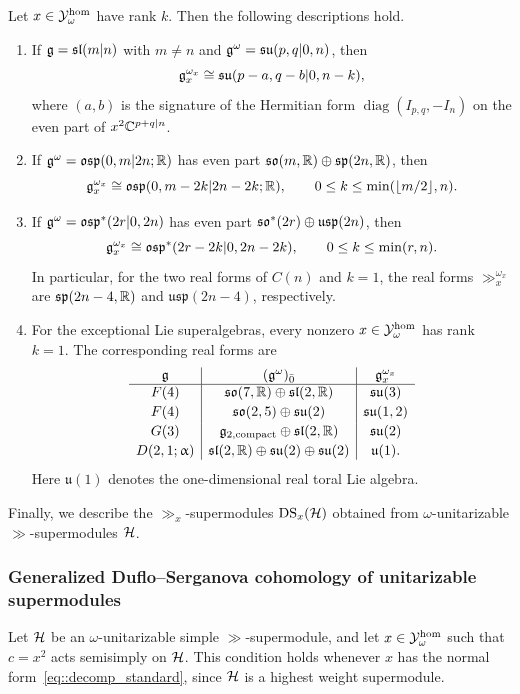 \begin{proposition}\label{prop::unitary_real_forms_and_DS}
Let $x\in\YY_\omega^{\hom}$ have rank $k$. Then the following descriptions hold. 
\begin{enumerate}
\item[(a)] If $\gg=\sl(m\vert n)$ with $m\neq n$ and $\gg^\omega=\su(p,q\vert0,n)$, then
\[
\gg_x^{\omega_x}
\cong\su(p-a,q-b\vert0,n-k),
\]
where $(a,b)$ is the signature of the Hermitian form $\operatorname{diag}(I_{p,q},-I_n)$ on the even part of $x^2\CC^{p+q\vert n}$.

\item[(b)] If $\gg^\omega=\osp(0,m\vert2n;\RR)$ has even part $\so(m,\RR)\oplus\sp(2n,\RR)$, then
\[
\gg_x^{\omega_x}
\cong\osp(0,m-2k\vert2n-2k;\RR),
\qquad
0\leq k\leq\min(\lfloor m/2\rfloor,n).
\]

\item[(c)] If $\gg^\omega=\osp^{\ast}(2r\vert0,2n)$ has even part $\so^{\ast}(2r)\oplus\mathfrak{usp}(2n)$, then
\[
\gg_x^{\omega_x}
\cong\osp^{\ast}(2r-2k\vert0,2n-2k),
\qquad
0\leq k\leq\min(r,n).
\]
In particular, for the two real forms of $C(n)$ and $k=1$, the real forms $\gg_x^{\omega_x}$ are $\sp(2n-4,\RR)$ and $\mathfrak{usp}(2n-4)$, respectively.

\item[(d)] For the exceptional Lie superalgebras, every nonzero $x\in\YY_\omega^{\hom}$ has rank $k=1$. The corresponding real forms are
\[
\begin{array}{c|c|c}
\gg & (\gg^\omega)_{\bar0} & \gg_x^{\omega_x}\\
\hline
F(4)
& \so(7,\RR)\oplus\sl(2,\RR)
& \su(3)
\\[2pt]
F(4)
& \so(2,5)\oplus\su(2)
& \su(1,2)
\\[2pt]
G(3)
& \gg_{2,\mathrm{compact}}\oplus\sl(2,\RR)
& \su(2)
\\[2pt]
D(2,1;\upalpha)
& \sl(2,\RR)\oplus\su(2)\oplus\su(2)
& \mathfrak u(1).
\end{array}
\]
Here $\mathfrak u(1)$ denotes the one-dimensional real toral Lie algebra.
\end{enumerate}
\end{proposition}

Finally, we describe the $\gg_x$-supermodules $\DS_{x}(\HH)$ obtained from $\omega$-unitarizable $\gg$-supermodules $\HH$.


\subsubsection{Generalized Duflo--Serganova cohomology of unitarizable supermodules}
Let $\HH$ be an $\omega$-unitarizable simple $\gg$-supermodule, and let $x\in\YY_\omega^{\hom}$ such that $c=x^2$ acts semisimply on $\HH$. This condition holds whenever $x$ has the normal form~\eqref{eq::decomp_standard}, since $\HH$ is a highest weight supermodule.

